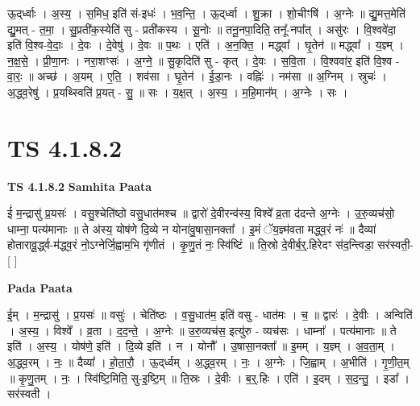 \documentclass[17pt]{extarticle}
\begin{document}
ऊ॒द्‌र्ध्वाः । अ॒स्य॒ । स॒मिध॒ इति॑ सं-इधः॑ । भ॒व॒न्ति॒ । ऊ॒द्‌र्ध्वा । शु॒क्रा । शो॒चीꣳषि॑ । अ॒ग्नेः ॥ द्यु॒मत्त॒मेति॑ द्यु॒मत् - त॒मा॒ । सु॒प्रती॑क॒स्येति॑ सु - प्रती॑कस्य । सू॒नोः ॥ तनू॒नपा॒दिति॒ तनू᳚-नपा᳚त् । असु॑रः । वि॒श्ववे॑दा॒ इति॑ वि॒श्व-वे॒दाः॒ । दे॒वः । दे॒वेषु॑ । दे॒वः ॥ प॒थः । एति॑ । अ॒न॒क्ति॒ । मद्ध्वा᳚ । घृ॒तेन॑ ॥ मद्ध्वा᳚ । य॒ज्ञ्म् । न॒क्ष॒से॒ । प्री॒णा॒नः । नरा॒शꣳसः॑ । अ॒ग्ने॒ ॥ सु॒कृदिति॑ सु - कृत् । दे॒वः । स॒वि॒ता । वि॒श्ववा॑र॒ इति॑ वि॒श्व - वा॒रः॒ ॥ अच्छ॑ । अ॒यम् । ए॒ति॒ । शव॑सा । घृ॒तेन॑ । ई॒डा॒नः । वह्निः॑ । नम॑सा ॥ अ॒ग्निम् । स्रुचः॑ । अ॒द्ध्व॒रेषु॑ । प्र॒यथ्स्विति॑ प्र॒यत् - सु॒ ॥ सः । य॒क्ष॒त् । अ॒स्य॒ । म॒हि॒मान᳚म् । अ॒ग्नेः । सः ।  \newline





\section{ TS 4.1.8.2 }

\textbf{TS 4.1.8.2 } \newline
\textbf{Samhita Paata} \newline

ई॑ म॒न्द्रासु॑ प्र॒यसः॑ । वसु॒श्चेति॑ष्ठो वसु॒धात॑मश्च ॥ द्वारो॑ दे॒वीरन्व॑स्य॒ विश्वे᳚ व्र॒ता द॑दन्ते अ॒ग्नेः । उ॒रु॒व्यच॑सो॒ धाम्ना॒ पत्य॑मानाः ॥ ते अ॑स्य॒ योष॑णे दि॒व्ये न योना॑वु॒षासा॒नक्ता᳚ । इ॒मं ॅय॒ज्ञ्म॑वता मद्ध्व॒रं नः॑ ॥ दैव्या॑ होतारावू॒र्द्ध्व-म॑द्ध्व॒रं नो॒ऽग्नेर्जि॒ह्वाम॒भि गृ॑णीतं । कृ॒णु॒तं नः॒ स्वि॑ष्टिं ॥ ति॒स्रो दे॒वीर्ब॒र्॒.हिरेदꣳ स॑द॒न्त्विडा॒ सर॑स्वती॒- [  ] \newline

\textbf{Pada Paata} \newline

ई॒म् । म॒न्द्रासु॑ । प्र॒यसः॑ ॥ वसुः॑ । चेति॑ष्ठः । व॒सु॒धात॑म॒ इति॑ वसु - धात॑मः । च॒ ॥ द्वारः॑ । दे॒वीः । अन्विति॑ । अ॒स्य॒ । विश्वे᳚ । व्र॒ता । द॒द॒न्ते॒ । अ॒ग्नेः ॥ उ॒रु॒व्यच॑स॒ इत्यु॑रु - व्यच॑सः । धाम्ना᳚ । पत्य॑मानाः ॥ ते इति॑ । अ॒स्य॒ । योष॑णे॒ इति॑ । दि॒व्ये इति॑ । न । योनौ᳚ । उ॒षासा॒नक्ता᳚ ॥ इ॒मम् । य॒ज्ञ्म् । अ॒व॒ता॒म् । अ॒द्ध्व॒रम् । नः॒ ॥ दैव्या᳚ । हो॒ता॒रौ॒ । ऊ॒द्‌र्ध्वम् । अ॒द्ध्व॒रम् । नः॒ । अ॒ग्नेः । जि॒ह्वाम् । अ॒भीति॑ । गृ॒णी॒त॒म् ॥ कृ॒णु॒तम् । नः॒ । स्वि॑ष्टि॒मिति॒ सु-इ॒ष्टि॒म् ॥ ति॒स्रः । दे॒वीः । ब॒र्॒.हिः । एति॑ । इ॒दम् । स॒द॒न्तु॒ । इडा᳚ । सर॑स्वती ।  \newline
\end{document}
